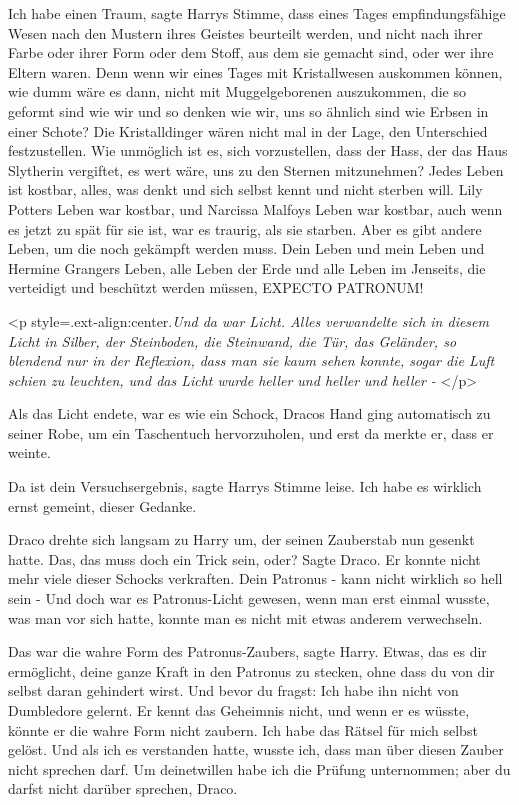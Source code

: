 \glqq Ich habe einen Traum\grqq{}, sagte Harrys Stimme, \glqq dass eines Tages
empfindungsfähige Wesen nach den Mustern ihres Geistes beurteilt werden, und
nicht nach ihrer Farbe oder ihrer Form oder dem Stoff, aus dem sie gemacht sind,
oder wer ihre Eltern waren. Denn wenn wir eines Tages mit Kristallwesen
auskommen können, wie dumm wäre es dann, nicht mit Muggelgeborenen auszukommen,
die so geformt sind wie wir und so denken wie wir, uns so ähnlich sind wie
Erbsen in einer Schote? Die Kristalldinger wären nicht mal in der Lage, den
Unterschied festzustellen. Wie unmöglich ist es, sich vorzustellen, dass der
Hass, der das Haus Slytherin vergiftet, es wert wäre, uns zu den Sternen
mitzunehmen? Jedes Leben ist kostbar, alles, was denkt und sich selbst kennt und
nicht sterben will. Lily Potters Leben war kostbar, und Narcissa Malfoys Leben
war kostbar, auch wenn es jetzt zu spät für sie ist, war es traurig, als sie
starben. Aber es gibt andere Leben, um die noch gekämpft werden muss. Dein Leben
und mein Leben und Hermine Grangers Leben, alle Leben der Erde und alle Leben im
Jenseits, die verteidigt und beschützt werden müssen, EXPECTO PATRONUM!\grqq{}

<p style=\grqq{}.ext-align:center\grqq{}.\emph{Und da war Licht. Alles
verwandelte sich in diesem Licht in Silber, der Steinboden, die Steinwand, die
Tür, das Geländer, so blendend nur in der Reflexion, dass man sie kaum sehen
konnte, sogar die Luft schien zu leuchten, und das Licht wurde heller und heller
und heller - }</p>

Als das Licht endete, war es wie ein Schock, Dracos Hand ging automatisch zu
seiner Robe, um ein Taschentuch hervorzuholen, und erst da merkte er, dass er
weinte.

\glqq Da ist dein Versuchsergebnis\grqq{}, sagte Harrys Stimme leise. \glqq Ich
habe es wirklich ernst gemeint, dieser Gedanke.\grqq{}

Draco drehte sich langsam zu Harry um, der seinen Zauberstab nun gesenkt hatte.
\glqq Das, das muss doch ein Trick sein, oder?\grqq{} Sagte Draco. Er konnte
nicht mehr viele dieser Schocks verkraften. \glqq Dein Patronus - kann nicht
wirklich so hell sein -\grqq{} Und doch war es Patronus-Licht gewesen, wenn man
erst einmal wusste, was man vor sich hatte, konnte man es nicht mit etwas
anderem verwechseln.

\glqq Das war die wahre Form des Patronus-Zaubers\grqq{}, sagte Harry. \glqq
Etwas, das es dir ermöglicht, deine ganze Kraft in den Patronus zu stecken, ohne
dass du von dir selbst daran gehindert wirst. Und bevor du fragst: Ich habe ihn
nicht von Dumbledore gelernt. Er kennt das Geheimnis nicht, und wenn er es
wüsste, könnte er die wahre Form nicht zaubern. Ich habe das Rätsel für mich
selbst gelöst. Und als ich es verstanden hatte, wusste ich, dass man über diesen
Zauber nicht sprechen darf. Um deinetwillen habe ich die Prüfung unternommen;
aber du darfst nicht darüber sprechen, Draco.\grqq{}

